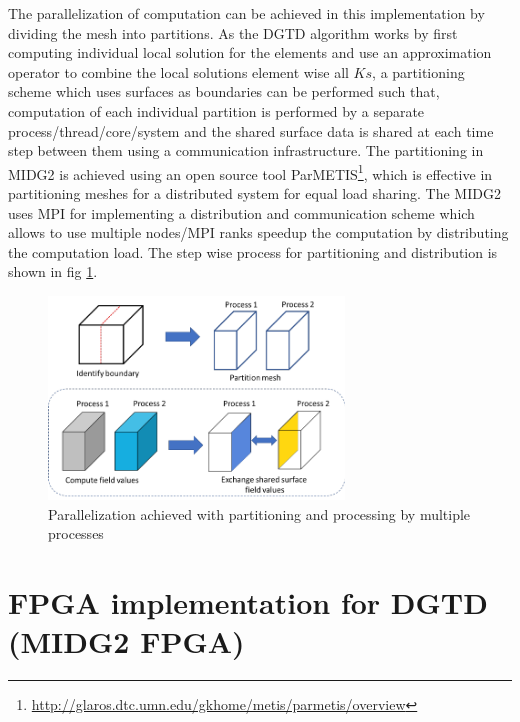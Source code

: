 The parallelization of computation can be achieved in this implementation by dividing
the mesh into partitions. As the \ac{DGTD} algorithm works by first computing individual
local solution for the elements and use an approximation operator to combine the local
solutions element wise all $Ks$,
a partitioning scheme which uses surfaces as boundaries can be performed such that,
computation of each individual partition is performed by a separate
process/thread/core/system and the shared surface data is shared at each time step
between them using a communication infrastructure. The partitioning in MIDG2 is
achieved using an open source tool ParMETIS\footnote{\url{http://glaros.dtc.umn.edu/gkhome/metis/parmetis/overview}},
which is effective in partitioning meshes for a distributed system for equal load sharing.
The MIDG2 uses \ac{MPI} for implementing a distribution and communication scheme which
allows to use multiple nodes/MPI ranks speedup the computation by distributing the computation load.
The step wise process for partitioning and distribution is shown in fig \ref{fig:partitioning}.
\begin{figure}[h]%
    \centering
    \includegraphics[width=0.7\textwidth]{images/partition_proc}
    \caption{Parallelization achieved with partitioning and processing by multiple processes}
    \label{fig:partitioning}
\end{figure}

\section{FPGA implementation for DGTD (MIDG2 FPGA)}
\label{sec:fpga_dg}

